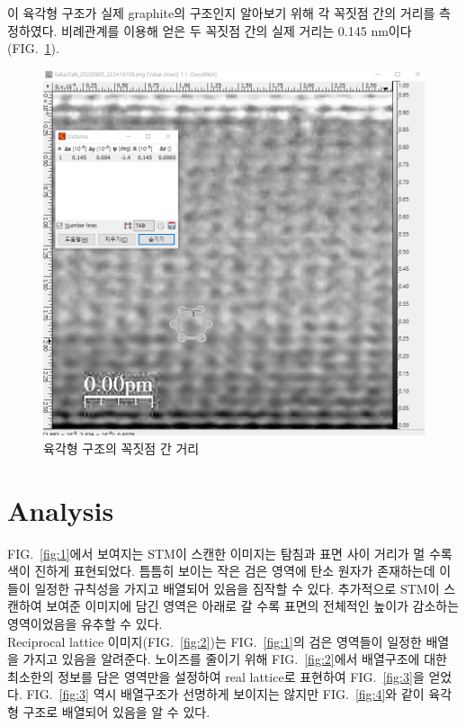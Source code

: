 \documentclass[aps,reprint,superscriptaddress,11pt]{revtex4-2}
\begin{document}
이 육각형 구조가 실제 graphite의 구조인지 알아보기 위해 각 꼭짓점 간의 거리를 측정하였다.
비례관계를 이용해 얻은 두 꼭짓점 간의 실제 거리는 0.145 nm이다(FIG.~\ref{fig:5}).
\begin{figure}[htp]
  \includegraphics[scale=0.35]{fig5.png}
  \caption{육각형 구조의 꼭짓점 간 거리}
  \label{fig:5}
\end{figure}

\section{Analysis}
FIG.~\ref{fig:1}에서 보여지는 STM이 스캔한 이미지는 탐침과 표면 사이 거리가 
멀 수록 색이 진하게 표현되었다. 틈틈히 보이는 작은 검은 영역에 탄소 원자가 존재하는데
이들이 일정한 규칙성을 가지고 배열되어 있음을 짐작할 수 있다. 추가적으로 STM이 스캔하여 보여준 
이미지에 담긴 영역은 아래로 갈 수록 표면의 전체적인 높이가 감소하는 영역이었음을 유추할 수 있다.\\
Reciprocal lattice 이미지(FIG.~\ref{fig:2})는 FIG.~\ref{fig:1}의 검은 영역들이
일정한 배열을 가지고 있음을 알려준다. 노이즈를 줄이기 위해 FIG.~\ref{fig:2}에서 배열구조에 대한
최소한의 정보를 담은 영역만을 설정하여 real lattice로 표현하여 FIG.~\ref{fig:3}을 얻었다. 
FIG.~\ref{fig:3} 역시 배열구조가 선명하게 보이지는 않지만 FIG.~\ref{fig:4}와 같이 육각형 구조로
배열되어 있음을 알 수 있다. 
\end{document}
